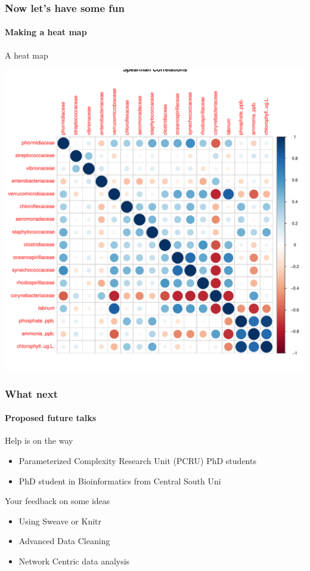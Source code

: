 \documentclass[10pt,handout,english]{beamer}\usepackage[]{graphicx}\usepackage[]{color}
\newenvironment{knitrout}{}{} %
\begin{document}
 \begin{frame}[fragile]
  \frametitle{Now let's have some fun}
  \framesubtitle{Making a heat map}
\begin{block}{A heat map}
\end{block}
\begin{knitrout}
\color{fgcolor}
\includegraphics[width=.85\linewidth]{figure/chunk12i-1} 

\end{knitrout}
\end{frame}
\begin{frame}
  \frametitle{What next}
  \framesubtitle{Proposed future talks}
  \begin{block}{Help is on the way}
  \begin{itemize}
  \item Parameterized Complexity Research Unit (PCRU) PhD students
  \item PhD student in Bioinformatics from Central South Uni
  \end{itemize}
  \end{block}
  \begin{block}{Your feedback on some ideas}
  \begin{itemize}
  \item Using Sweave or Knitr
  \item Advanced Data Cleaning 
  \item Network Centric data analysis
  \end{itemize}
  \end{block}
\end{frame}
\end{document}
